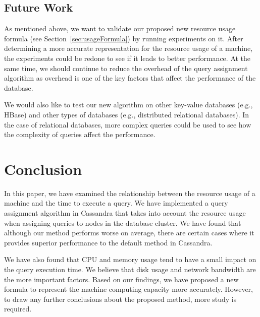 \subsection{Future Work}
As mentioned above, we want to validate our proposed new resource usage formula (see Section~\ref{sec:usageFormula}) by running experiments on it. After determining a more accurate representation for the resource usage of a machine, the experiments could be redone to see if it leads to better performance. At the same time, we should continue to reduce the overhead of the query assignment algorithm as overhead is one of the key factors that affect the performance of the database.

We would also like to test our new algorithm on other key-value databases (e.g., HBase) and other types of databases (e.g., distributed relational databases). In the case of relational databases, more complex queries could be used to see how the complexity of queries affect the performance.

\section{Conclusion}
\label{sec:conclusion}
In this paper, we have examined the relationship between the resource usage of a machine and the time to execute a query. We have implemented a query assignment algorithm in Cassandra that takes into account the resource usage when assigning queries to nodes in the database cluster. We have found that although our method performs worse on average, there are certain cases where it provides superior performance to the default method in Cassandra. 

We have also found that CPU and memory usage tend to have a small impact on the query execution time. We believe that disk usage and network bandwidth are the more important factors. Based on our findings, we have proposed a new formula to represent the machine computing capacity more accurately. However, to draw any further conclusions about the proposed method, more study is required.
